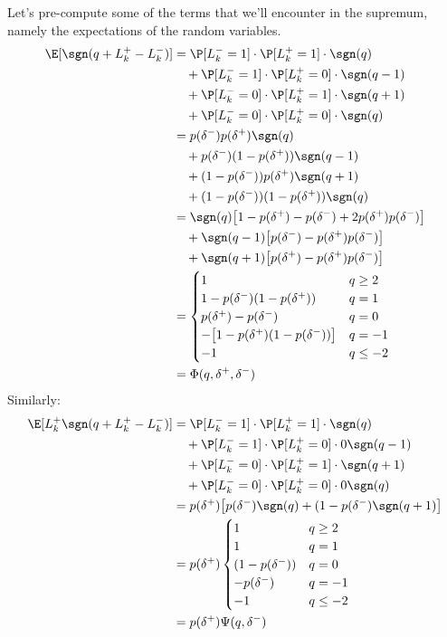 \documentclass[12pt]{article}
\begin{document}
Let's pre-compute some of the terms that we'll encounter in the supremum, namely the expectations of the random variables. 
\begin{align}
\E [\sgn(q + L_k^+ - L_k^-)] & = \P[L_k^- = 1] \cdot \P[L_k^+ = 1] \cdot \sgn(q) \nonumber \\
& \quad + \P[L_k^- = 1] \cdot \P[L_k^+ = 0] \cdot \sgn(q - 1) \nonumber \\
& \quad +  \P[L_k^- = 0] \cdot \P[L_k^+ = 1] \cdot \sgn(q+1) \nonumber \\
& \quad + \P[L_k^- = 0] \cdot \P[L_k^+ = 0] \cdot \sgn(q) \nonumber \\
& = p(\delta^-)p(\delta^+) \sgn(q) \nonumber \\
& \quad + p(\delta^-) (1-p(\delta^+)) \sgn(q - 1) \nonumber \\
& \quad + (1 - p(\delta^-)) p(\delta^+)  \sgn(q+1) \nonumber \\
& \quad + (1 - p(\delta^-)) (1-p(\delta^+))  \sgn(q) \nonumber \\
& = \sgn(q) \bigl[ 1 - p(\delta^+) - p(\delta^-) + 2 p(\delta^+) p(\delta^-) \bigr] \nonumber \\
& \quad + \sgn(q-1) \bigl[ p(\delta^-)  - p(\delta^+) p(\delta^-) \bigr]  \nonumber \\
& \quad + \sgn(q+1) \bigl[ p(\delta^+)  - p(\delta^+) p(\delta^-) \bigr]  \nonumber \\
& = \begin{cases} 
1 & q \geq 2 \\
1 - p(\delta^-)(1 - p(\delta^+)) & q = 1 \\
p(\delta^+) - p(\delta^-) & q = 0 \\
-\bigl[ 1 - p(\delta^+)(1 - p(\delta^-)) \bigr] & q = -1 \\
-1 & q \leq -2
\end{cases} \\
& = \Phi(q, \delta^+, \delta^-)
\end{align}
Similarly:
\begin{align}
\E [ L_k^+ \sgn(q + L_k^+ - L_k^-)] & = \P[L_k^- = 1] \cdot \P[L_k^+ = 1] \cdot \sgn(q) \nonumber \\
& \quad + \P[L_k^- = 1] \cdot \P[L_k^+ = 0] \cdot 0 \sgn(q - 1) \nonumber \\
& \quad +  \P[L_k^- = 0] \cdot \P[L_k^+ = 1] \cdot \sgn(q+1) \nonumber \\
& \quad + \P[L_k^- = 0] \cdot \P[L_k^+ = 0] \cdot 0 \sgn(q) \nonumber \\
& = p(\delta^+) \bigl[ p(\delta^-) \sgn(q) + (1-p(\delta^-) \sgn(q+1) \bigr] \nonumber \\
& = p(\delta^+) \begin{cases} 
1 & q \geq 2 \\
1 & q = 1 \\
(1 - p(\delta^-)) & q = 0 \\
-p(\delta^-) & q = -1 \\
-1 & q \leq -2
\end{cases} \\
& = p(\delta^+) \Psi(q, \delta^-)
\end{align}
\end{document}
